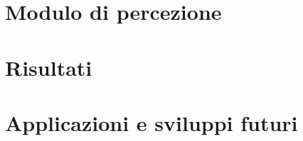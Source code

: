 \documentclass[14pt,a4paper]{extarticle}
\begin{document}
\section{Modulo di percezione}


\section{Risultati}

\section{Applicazioni e sviluppi futuri}

\newpage
%

\newpage \lstlistoflistings 
\listoffigures
\newpage\printbibliography
\end{document}
